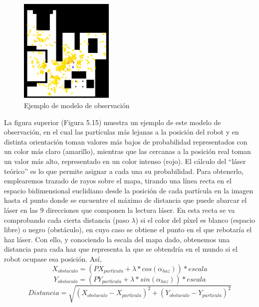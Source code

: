 \begin{figure}[H]
\begin{center}
	\includegraphics[width=0.4\textwidth]{figures/modeloobsv.png}
	\caption{Ejemplo de modelo de observación}
	\label{fig.modeloobsv}
	\end{center}
\end{figure}
La figura superior (Figura 5.15) muestra un ejemplo de este modelo de observación, en el cual las partículas más lejanas a la posición del robot y en distinta orientación toman valores más bajos de probabilidad representados con un color más claro (amarillo), mientras que las cercanas a la posición real toman un valor más alto, representado en un color intenso (rojo). El cálculo del “láser teórico” es lo que permite asignar a cada una su probabilidad. Para obtenerlo, emplearemos trazado de rayos sobre el mapa, tirando una línea recta en el espacio bidimensional euclidiano desde la posición de cada partícula en la imagen hasta el punto donde se encuentre el máximo de distancia que puede abarcar el láser en las 9 direcciones que componen la lectura láser. En esta recta se va comprobando cada cierta distancia (paso $\lambda$) si el color del píxel es blanco (espacio libre) o negro (obstáculo), en cuyo caso se obtiene el punto en el que rebotaría el haz láser. Con ello, y conociendo la escala del mapa dado, obtenemos una distancia para cada haz que representa la que se obtendría en el mundo si el robot ocupase esa posición. Así, 
\begin{equation}
X_{obstaculo} = (PX_{partícula} + \lambda*cos(\alpha_{haz}))*escala
\end{equation}
\begin{equation}
Y_{obstaculo} = (PY_{partícula} + \lambda*sin(\alpha_{haz}))*escala
\end{equation}
\begin{equation}
Distancia = \sqrt{(X_{obstaculo}-X_{partícula})^2+(Y_{obstaculo}-Y_{partícula})^2}
\end{equation}

